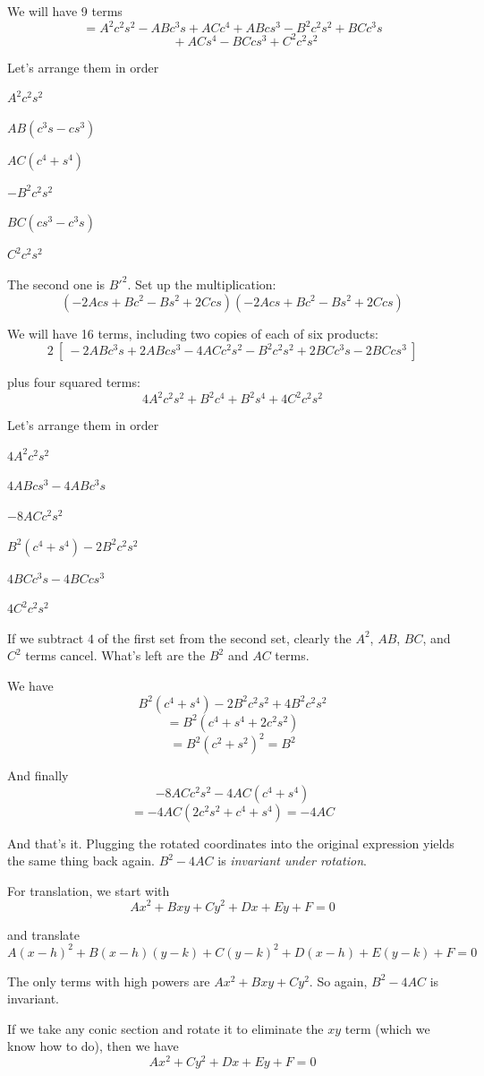 \documentclass[11pt, oneside]{article}
\begin{document}
We will have 9 terms
\[ = A^2c^2s^2 - ABc^3s + ACc^4 + ABcs^3 - B^2c^2s^2 + BCc^3s \]
\[ \ \ \ \ \ \ \  \ \ + ACs^4 - BCcs^3 + C^2c^2s^2 \]

Let's arrange them in order

$A^2c^2s^2$

$AB(c^3s - cs^3)$

$AC(c^4 + s^4)$

$-B^2c^2s^2$

$BC(cs^3-c^3s)$

$C^2c^2s^2$

The second one is $B'^2$.  Set up the multiplication:
\[ (-2Acs + Bc^2 - Bs^2 + 2Ccs)(-2Acs + Bc^2 - Bs^2 + 2Ccs)  \]

We will have 16 terms, including two copies of each of six products:
\[ 2 \ [ \ - 2ABc^3s + 2ABcs^3 - 4ACc^2s^2 - B^2c^2s^2 + 2BCc^3s - 2BCcs^3 \ ] \]

plus  four squared terms:
\[ 4A^2c^2s^2 + B^2c^4 + B^2s^4 + 4C^2c^2s^2 \]

Let's arrange them in order

$4A^2c^2s^2$

$4ABcs^3 - 4ABc^3s$

$-8ACc^2s^2$

$B^2(c^4 + s^4) - 2B^2c^2s^2$

$4BCc^3s - 4BCcs^3$

$4C^2c^2s^2$

If we subtract $4$ of the first set from the second set, clearly the $A^2$, $AB$, $BC$, and $C^2$ terms cancel.  What's left are the $B^2$ and $AC$ terms.

We have
\[ B^2(c^4 + s^4) - 2B^2c^2s^2 + 4B^2c^2s^2 \]
\[ = B^2(c^4 + s^4 + 2c^2s^2) \]
\[ = B^2(c^2 + s^2)^2 = B^2 \]

And finally
\[ -8ACc^2s^2 - 4AC(c^4 + s^4) \]
\[ = -4AC(2c^2s^2 + c^4 + s^4) = -4AC \]

And that's it.  Plugging the rotated coordinates into the original expression yields the same thing back again.  $B^2 - 4AC$ is \emph{invariant under rotation}.

For translation, we start with
\[ Ax^2 + Bxy + Cy^2 + Dx + Ey + F = 0 \]

and translate
\[ A(x-h)^2 + B(x-h)(y-k) + C(y-k)^2 + D(x-h) + E(y-k) + F = 0 \]

The only terms with high powers are $Ax^2 + Bxy + Cy^2$.  So again, $B^2 - 4AC$ is invariant.

If we take any conic section and rotate it to eliminate the $xy$ term (which we know how to do), then we have
\[ Ax^2 + Cy^2 + Dx + Ey + F = 0 \]
\end{document}
